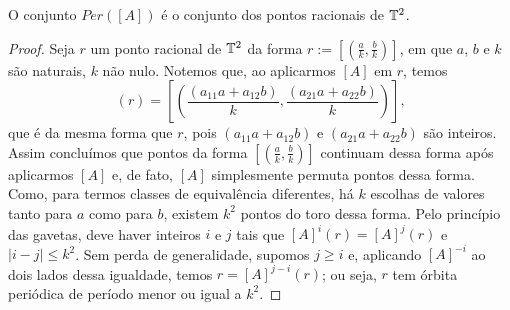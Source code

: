 \begin{proposition}
O conjunto $Per([A])$ é o conjunto dos pontos racionais de $\mathbb{T}^2$.
\end{proposition}
\begin{proof}
Seja $r$ um ponto racional de $\mathbb{T}^2$ da forma $r := [(\frac{a}{k}, \frac{b}{k})]$, em que $a$, $b$ e $k$ são naturais, $k$ não nulo. Notemos que, ao aplicarmos $[A]$ em $r$, temos
	\begin{equation*}
	[A](r) = \left[ \left(\frac{(a_{11}a + a_{12}b)}{k}, \frac{(a_{21}a + a_{22}b)}{k} \right) \right] \text{,}
	\end{equation*}
que é da mesma forma que $r$, pois $(a_{11}a + a_{12}b)$ e $(a_{21}a + a_{22}b)$ são inteiros. Assim concluímos que pontos da forma $[(\frac{a}{k}, \frac{b}{k})]$ continuam dessa forma após aplicarmos $[A]$ e, de fato, $[A]$ simplesmente permuta pontos dessa forma. Como, para termos classes de equivalência diferentes, há $k$ escolhas de valores tanto para $a$ como para $b$, existem $k^2$ pontos do toro dessa forma. Pelo princípio das gavetas, deve haver inteiros $i$ e $j$ tais que $[A]^i(r) = [A]^j(r)$ e $|i-j| \leq k^2$. Sem perda de generalidade, supomos $j \geq i$ e, aplicando $[A]^{-i}$ ao dois lados dessa igualdade, temos $r = [A]^{j-i}(r)$; ou seja, $r$ tem órbita periódica de período menor ou igual a $k^2$.
\end{proof}



